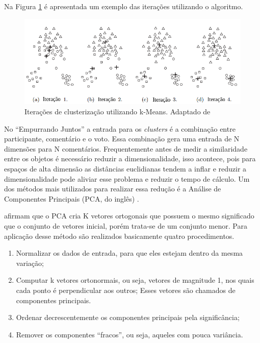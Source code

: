 Na Figura \ref{fig:iteracoes_kmeans} é apresentada um exemplo das iterações utilizando o algoritmo.

\begin{figure}[h!]
\centering
\includegraphics[scale=0.6]{figuras/iteracoes_kmeans.png}
\caption{Iterações de clusterização utilizando k-Means. Adaptado de }
\label{fig:iteracoes_kmeans}
\end{figure}

No ``Empurrando Juntos'' a entrada para os \textit{clusters} é a combinação entre participante,  
comentário e o voto. Essa combinação gera uma entrada de N dimensões para N comentários.
Frequentemente antes de medir a similaridade entre os objetos é necessário
reduzir a dimensionalidade, isso acontece, pois para espaços de alta dimensão as distâncias euclidianas
tendem a inflar e reduzir a dimensionalidade pode aliviar esse problema e reduzir o tempo de cálculo.
Um dos métodos mais utilizados para realizar essa redução é a Análise de 
Componentes Principais (PCA, do inglês) \cite{han2011data, sklearn}.


 afirmam que o PCA cria K vetores ortogonais que possuem o mesmo significado que o conjunto
de vetores inicial, porém trata-se de um conjunto menor. Para aplicação desse método são realizados basicamente quatro procedimentos.

\begin{enumerate}
 \item Normalizar os dados de entrada, para que eles estejam dentro da mesma variação;
 \item Computar k vetores ortonormais, ou seja, vetores de magnitude 1, nos quais cada ponto é perpendicular aos outros;
  \subitem Esses vetores são chamados de componentes principais.
 \item Ordenar decrescentemente os componentes principais pela significância;
 \item Remover os componentes ``fracos'', ou seja, aqueles com pouca variância.
\end{enumerate}

